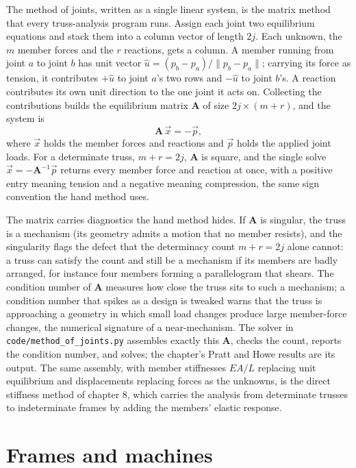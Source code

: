 \begin{mastery}
The method of joints, written as a single linear system, is the matrix
method that every truss-analysis program runs. Assign each joint two
equilibrium equations and stack them into a column vector of length $2j$.
Each unknown, the $m$ member forces and the $r$ reactions, gets a column.
A member running from joint $a$ to joint $b$ has unit vector
$\hat{u} = (p_b - p_a)/\lVert p_b - p_a \rVert$; carrying its force as
tension, it contributes $+\hat{u}$ to joint $a$'s two rows and $-\hat{u}$
to joint $b$'s. A reaction contributes its own unit direction to the one
joint it acts on. Collecting the contributions builds the equilibrium
matrix $\mathbf{A}$ of size $2j \times (m + r)$, and the system is
\[
\mathbf{A}\, \vec{x} = -\vec{p},
\]
where $\vec{x}$ holds the member forces and reactions and $\vec{p}$ holds
the applied joint loads. For a determinate truss, $m + r = 2j$,
$\mathbf{A}$ is square, and the single solve $\vec{x} = -\mathbf{A}^{-1}
\vec{p}$ returns every member force and reaction at once, with a positive
entry meaning tension and a negative meaning compression, the same sign
convention the hand method uses.

The matrix carries diagnostics the hand method hides. If $\mathbf{A}$ is
singular, the truss is a mechanism (its geometry admits a motion that no
member resists), and the singularity flags the defect that the
determinacy count $m + r = 2j$ alone cannot: a truss can satisfy the
count and still be a mechanism if its members are badly arranged, for
instance four members forming a parallelogram that shears. The condition
number of $\mathbf{A}$ measures how close the truss sits to such a
mechanism; a condition number that spikes as a design is tweaked warns
that the truss is approaching a geometry in which small load changes
produce large member-force changes, the numerical signature of a
near-mechanism. The solver in \texttt{code/method\_of\_joints.py}
assembles exactly this $\mathbf{A}$, checks the count, reports the
condition number, and solves; the chapter's Pratt and Howe results are
its output. The same assembly, with member stiffnesses $EA/L$ replacing
unit equilibrium and displacements replacing forces as the unknowns, is
the direct stiffness method of chapter 8, which carries the analysis from
determinate trusses to indeterminate frames by adding the members'
elastic response.
\end{mastery}

\section{Frames and machines}

